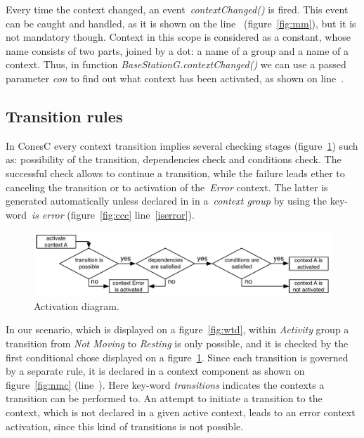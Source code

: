 Every time the context changed, an event~\emph{contextChanged()} is fired. This event can be
caught and handled, as it is shown on the line~ (figure~\ref{fig:mm}),
but it is not mandatory though. Context in this scope is considered as a constant,
whose name consists of two parts, joined by a dot: a name of a group and a name
of a context. Thus, in function \emph{BaseStationG.contextChanged()} we can use
a passed parameter \emph{con} to find out what context has been activated, as
shown on line~.

\subsection{Transition rules}\label{subsec:rules}

In ConesC every context transition implies several checking stages (figure~\ref{fig:ad}) such as:
possibility of the transition, dependencies check and conditions check. The successful check allows
to continue a transition, while the failure leads ether to canceling the transition or to
activation of the~\emph{Error} context. The latter is generated automatically unless declared in
in a~\emph{context group} by using the key-word~\emph{is error} (figure~\ref{fig:ccc}
line~\ref{iserror}).

\begin{figure}[!h]
\centering
\includegraphics[width=\columnwidth]{pdf/activation_diagram}
\caption{Activation diagram.}
\label{fig:ad}
\end{figure}

In our scenario, which is displayed on a figure~\ref{fig:wtd}, within \emph{Activity} group a
transition from \emph{Not Moving} to \emph{Resting} is only possible, and it is checked
by the first conditional chose displayed on a figure~\ref{fig:ad}.
Since each transition is governed by a separate rule, it is declared in a context component as shown
on figure~\ref{fig:nmc} (line~). Here key-word \emph{transitions} indicates the
contexts a transition can be performed to. An attempt to initiate
a transition to the context, which is not declared in a given active context, leads to an error context
activation, since this kind of transitions is not possible.


